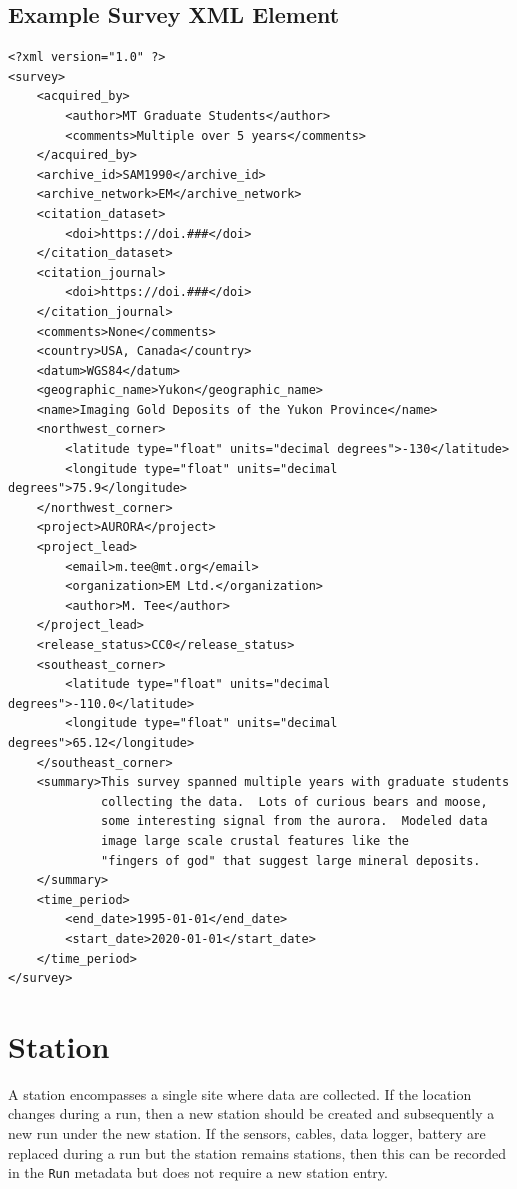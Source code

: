 \documentclass[12pt]{article}
\begin{document}
\clearpage
\newpage
\subsection{Example Survey XML Element}

\begin{verbatim}
<?xml version="1.0" ?>
<survey>
    <acquired_by>
        <author>MT Graduate Students</author>
        <comments>Multiple over 5 years</comments>
    </acquired_by>
    <archive_id>SAM1990</archive_id>
    <archive_network>EM</archive_network>
    <citation_dataset>
        <doi>https://doi.###</doi>
    </citation_dataset>
    <citation_journal>
        <doi>https://doi.###</doi>
    </citation_journal>
    <comments>None</comments>
    <country>USA, Canada</country>
    <datum>WGS84</datum>
    <geographic_name>Yukon</geographic_name>
    <name>Imaging Gold Deposits of the Yukon Province</name>
    <northwest_corner>
        <latitude type="float" units="decimal degrees">-130</latitude>
        <longitude type="float" units="decimal degrees">75.9</longitude>
    </northwest_corner>
    <project>AURORA</project>
    <project_lead>
        <email>m.tee@mt.org</email>
        <organization>EM Ltd.</organization>
        <author>M. Tee</author>
    </project_lead>
    <release_status>CC0</release_status>
    <southeast_corner>
        <latitude type="float" units="decimal degrees">-110.0</latitude>
        <longitude type="float" units="decimal degrees">65.12</longitude>
    </southeast_corner>
    <summary>This survey spanned multiple years with graduate students
             collecting the data.  Lots of curious bears and moose,
             some interesting signal from the aurora.  Modeled data
             image large scale crustal features like the 
             "fingers of god" that suggest large mineral deposits.
    </summary>
    <time_period>
        <end_date>1995-01-01</end_date>
        <start_date>2020-01-01</start_date>
    </time_period>
</survey>
\end{verbatim}

\clearpage
\newpage
\section{Station}

A station encompasses a single site where data are collected. If the location changes during a run, then a new station should be created and subsequently a new run under the new station. If the sensors, cables, data logger, battery are replaced during a run but the station remains stations, then this can be recorded in the \verb|Run| metadata but does not require a new station entry.
\end{document}
